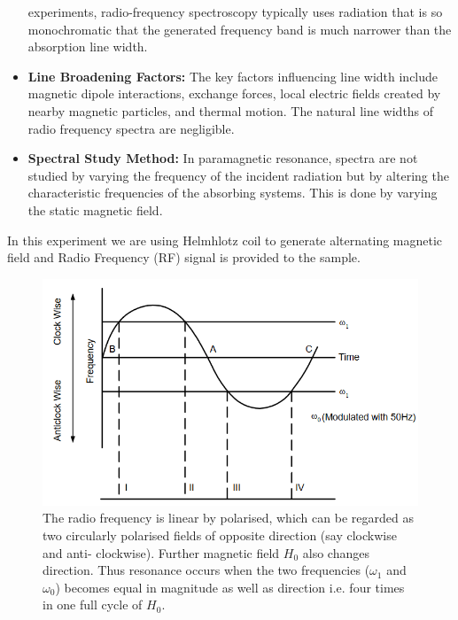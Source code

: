 \begin{itemize}
    experiments, radio-frequency spectroscopy typically uses radiation that is so monochromatic
    that the generated frequency band is much narrower than the absorption line width.\\
    \item \textbf{Line Broadening Factors:} The key factors
    influencing line width include magnetic dipole
    interactions, exchange forces, local electric fields
    created by nearby magnetic particles, and thermal motion. The natural line widths of radio frequency spectra are negligible.\\
    \item \textbf{Spectral Study Method:} In paramagnetic
    resonance, spectra are not studied by varying
    the frequency of the incident radiation but by
    altering the characteristic frequencies of the absorbing systems. This is done by varying the
    static magnetic field.
\end{itemize}

In this experiment we are using Helmhlotz coil to
generate alternating magnetic field and Radio Frequency (RF) signal is provided to the sample.

\begin{figure}
    \centering
    \includegraphics[width=0.7\columnwidth]{images/f3.png}
    \caption{The radio frequency is linear by polarised,
    which can be regarded as two circularly polarised
    fields of opposite direction (say clockwise and anti-
    clockwise). Further magnetic field $H_0$ also changes
    direction. Thus resonance occurs when the two frequencies ($\omega_1$ and $\omega_0$) becomes equal in magnitude as
    well as direction i.e. four times in one full cycle of
    $H_0$.}
    \label{f2}
\end{figure}

